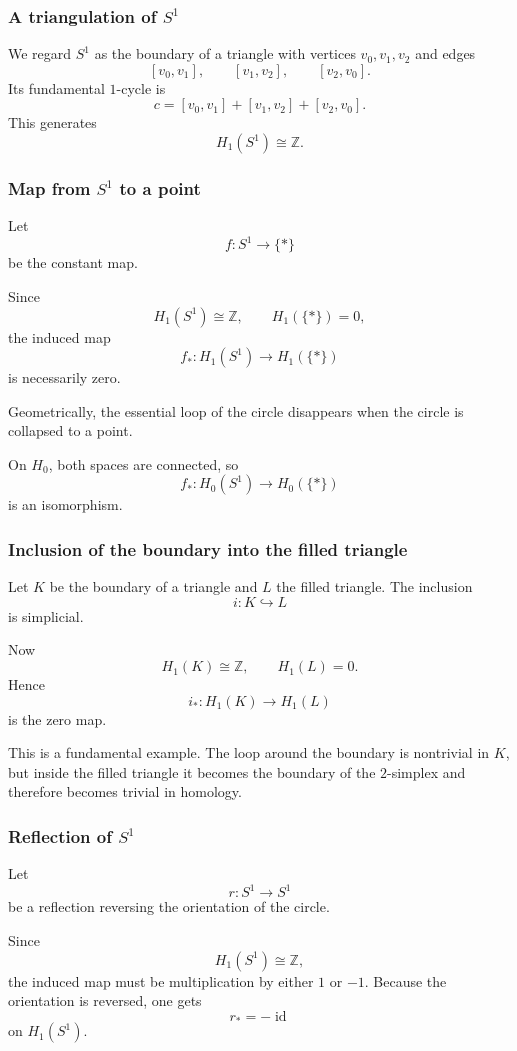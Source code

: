 \documentclass[12pt,a4paper]{article}
\theoremstyle{notespace}
\begin{document}
\subsubsection{A triangulation of \texorpdfstring{$S^1$}{S1}}

We regard \(S^1\) as the boundary of a triangle with vertices \(v_0,v_1,v_2\) and edges
\[
[v_0,v_1],\qquad [v_1,v_2],\qquad [v_2,v_0].
\]
Its fundamental \(1\)-cycle is
\[
c=[v_0,v_1]+[v_1,v_2]+[v_2,v_0].
\]
This generates
\[
H_1(S^1)\cong \mathbb{Z}.
\]

\subsubsection{Map from \texorpdfstring{$S^1$}{S1} to a point}

Let
\[
f:S^1\to \{*\}
\]
be the constant map.

Since
\[
H_1(S^1)\cong \mathbb{Z},
\qquad
H_1(\{*\})=0,
\]
the induced map
\[
f_*:H_1(S^1)\to H_1(\{*\})
\]
is necessarily zero.

Geometrically, the essential loop of the circle disappears when the circle is collapsed to a point.

On \(H_0\), both spaces are connected, so
\[
f_*:H_0(S^1)\to H_0(\{*\})
\]
is an isomorphism.

\subsubsection{Inclusion of the boundary into the filled triangle}

Let \(K\) be the boundary of a triangle and \(L\) the filled triangle. The inclusion
\[
i:K\hookrightarrow L
\]
is simplicial.

Now
\[
H_1(K)\cong \mathbb{Z},
\qquad
H_1(L)=0.
\]
Hence
\[
i_*:H_1(K)\to H_1(L)
\]
is the zero map.

This is a fundamental example. The loop around the boundary is nontrivial in \(K\), but inside the filled triangle it becomes the boundary of the \(2\)-simplex and therefore becomes trivial in homology.

\subsubsection{Reflection of \texorpdfstring{$S^1$}{S1}}

Let
\[
r:S^1\to S^1
\]
be a reflection reversing the orientation of the circle.

Since
\[
H_1(S^1)\cong \mathbb{Z},
\]
the induced map must be multiplication by either \(1\) or \(-1\). Because the orientation is reversed, one gets
\[
r_*=-\operatorname{id}
\]
on \(H_1(S^1)\).
\end{document}
